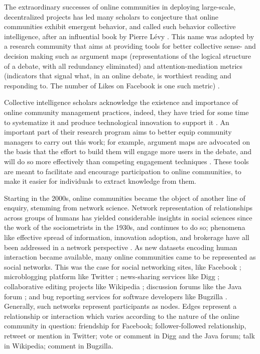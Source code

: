 \documentclass{nws}
\begin{document}
The extraordinary successes of online communities in deploying large-scale, decentralized projects has led many scholars to conjecture that online communities exhibit emergent behavior, and called such behavior collective intelligence, after an influential book by Pierre L\'evy \cite{pierre1997collective}. This name was adopted by a research community that aims at providing tools for better collective sense- and decision making such as argument maps (representations of the logical structure of a debate, with all redundancy eliminated) \cite{shum2003roots} and attention-mediation metrics (indicators that signal what, in an online debate, is worthiest reading and responding to. The number of Likes on Facebook is one such metric) \cite{klein2012enabling}. 

Collective intelligence scholars acknowledge the existence and importance of online community management practices, indeed, they have tried for some time to systematize it \cite{blondel2008fast, diplaris2011emerging} and produce technological innovation to support it \cite{de2012contested}. An important part of their research program aims to better equip community managers to carry out this work; for example, argument maps are advocated on the basis that the effort to build them will engage more users in the debate, and will do so more effectively than competing engagement techniques \cite{shum2003roots}. These tools are meant to facilitate and encourage participation to online communities, to make it easier for individuals to extract knowledge from them.

Starting in the 2000s, online communities became the object of another line of enquiry, stemming from network science. Network representation of relationships across groups of humans has yielded considerable insights in social sciences since the work of the sociometrists in the 1930s, and continues to do so; phenomena like effective spread of information, innovation adoption, and brokerage have all been addressed in a network perspective \cite{borgatti2009network, burt2009structural}. As new datasets encoding human interaction became available, many online communities came to be represented as social networks. This was the case for social networking sites, like Facebook \cite{lewis2008tastes, nick2013toward}; microblogging platform like Twitter \cite{kunegis2013preferential, java2007we, hodas2014simple}; news-sharing services like Digg \cite{hodas2014simple}; collaborative editing projects like Wikipedia \cite{laniado2011wikipedians}; discussion forums like the Java forum \cite{zhang2007expertise}; and bug reporting services for software developers like Bugzilla \cite{zanetti2012quantitative}. Generally, such networks represent participants as nodes. Edges represent a relationship or interaction which varies according to the nature of the online community in question: friendship for Facebook; follower-followed relationship, retweet or mention in Twitter; vote or comment in Digg and the Java forum; talk in Wikipedia; comment in Bugzilla. 
\end{document}
